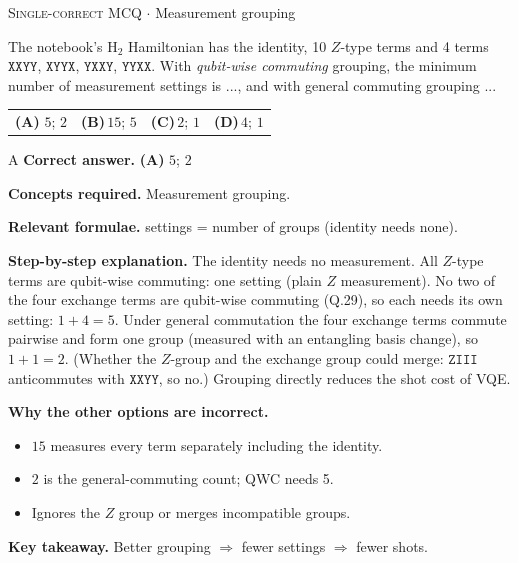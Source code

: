 \documentclass[11pt,a4paper]{article}
\newcommand{\optlabel}[1]{\textbf{(#1)}}
\newcommand{\correctlabel}[1]{\textcolor{okgreen}{\textbf{(#1)}\,\ding{51}}}
\newenvironment{qitem}[1]{\begin{list}{}{\setlength{\leftmargin}{3.3em}\setlength{\labelwidth}{3.1em}%
  \setlength{\labelsep}{0.2em}\setlength{\topsep}{3pt}\setlength{\parsep}{3pt}}\item[\textbf{Q.#1}\hfill]}{\end{list}}
\newcommand{\qsep}{\par\vspace{2pt}{\color{black!15}\hrule}\vspace{4pt}}
\newcommand{\qmeta}[2]{{\footnotesize\color{black!60}\textsc{#1} \;$\cdot$\; #2}\par}
\begin{document}
\begin{qitem}{54}
\qmeta{Single-correct MCQ}{Measurement grouping}
The notebook's H$_2$ Hamiltonian has the identity, 10 $Z$-type terms and 4 terms $\texttt{XXYY}$, $\texttt{XYYX}$, $\texttt{YXXY}$, $\texttt{YYXX}$. With
\emph{qubit-wise commuting} grouping, the minimum number of measurement settings is ..., and with general commuting grouping ...
\par\smallskip\noindent\begin{tabularx}{\linewidth}{@{}*{4}{L}@{}}
\correctlabel{A}\,$5$; $2$ & \optlabel{B}\,$15$; $5$ & \optlabel{C}\,$2$; $1$ & \optlabel{D}\,$4$; $1$
\end{tabularx}
\end{qitem}
\begin{solbox}{A}
\textbf{\color{brand}Correct answer.} \textcolor{okgreen}{\textbf{(A)}} $5$; $2$

\textbf{\color{brand}Concepts required.} Measurement grouping.

\textbf{\color{brand}Relevant formulae.} settings = number of groups (identity needs none).

\textbf{\color{brand}Step-by-step explanation.} The identity needs no measurement. All $Z$-type terms are qubit-wise commuting: one setting (plain $Z$ measurement). No two of the four
exchange terms are qubit-wise commuting (Q.29), so each needs its own setting: $1 + 4 = 5$. Under general commutation the four exchange
terms commute pairwise and form one group (measured with an entangling basis change), so $1 + 1 = 2$. (Whether the $Z$-group and the
exchange group could merge: $\texttt{ZIII}$ anticommutes with $\texttt{XXYY}$, so no.) Grouping directly reduces the shot cost of VQE.

\textbf{\color{brand}Why the other options are incorrect.}
\begin{itemize}[leftmargin=2.4em, itemsep=1pt, topsep=2pt]
\item[\textbf{(B)}] $15$ measures every term separately including the identity.
\item[\textbf{(C)}] $2$ is the general-commuting count; QWC needs 5.
\item[\textbf{(D)}] Ignores the $Z$ group or merges incompatible groups.
\end{itemize}
\textbf{\color{brand}Key takeaway.} Better grouping $\Rightarrow$ fewer settings $\Rightarrow$ fewer shots.
\end{solbox}
\qsep
\end{document}
